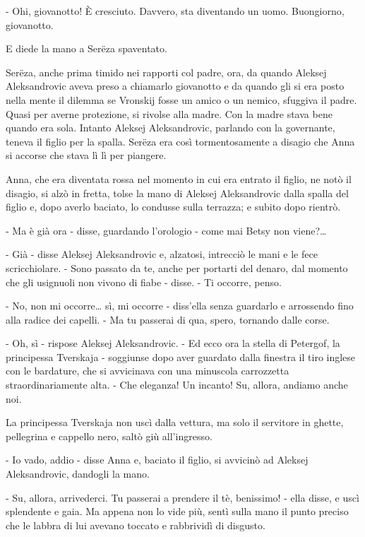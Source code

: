 - Ohi, giovanotto! È cresciuto. Davvero, sta diventando un uomo. Buongiorno, giovanotto. 

E diede la mano a Serëza spaventato. 

Serëza, anche prima timido nei rapporti col padre, ora, da quando Aleksej Aleksandrovic aveva preso a chiamarlo giovanotto e da quando gli si era posto nella mente il dilemma se Vronskij fosse un amico o un nemico, sfuggiva il padre. Quasi per averne protezione, si rivolse alla madre. Con la madre stava bene quando era sola. Intanto Aleksej Aleksandrovic, parlando con la governante, teneva il figlio per la spalla. Serëza era così tormentosamente a disagio che Anna si accorse che stava lì lì per piangere. 

Anna, che era diventata rossa nel momento in cui era entrato il figlio, ne notò il disagio, si alzò in fretta, tolse la mano di Aleksej Aleksandrovic dalla spalla del figlio e, dopo averlo baciato, lo condusse sulla terrazza; e subito dopo rientrò. 

- Ma è già ora - disse, guardando l'orologio - come mai Betsy non viene?\ldots{} 

- Già - disse Aleksej Aleksandrovic e, alzatosi, intrecciò le mani e le fece scricchiolare. - Sono passato da te, anche per portarti del denaro, dal momento che gli usignuoli non vivono di fiabe - disse. - Ti occorre, penso. 

- No, non mi occorre\ldots{} sì, mi occorre - diss'ella senza guardarlo e arrossendo fino alla radice dei capelli. - Ma tu passerai di qua, spero, tornando dalle corse. 

- Oh, sì - rispose Aleksej Aleksandrovic. - Ed ecco ora la stella di Petergof, la principessa Tverskaja - soggiunse dopo aver guardato dalla finestra il tiro inglese con le bardature, che si avvicinava con una minuscola carrozzetta straordinariamente alta. - Che eleganza! Un incanto! Su, allora, andiamo anche noi. 

La principessa Tverskaja non uscì dalla vettura, ma solo il servitore in ghette, pellegrina e cappello nero, saltò giù all'ingresso. 

- Io vado, addio - disse Anna e, baciato il figlio, si avvicinò ad Aleksej Aleksandrovic, dandogli la mano. 

- Su, allora, arrivederci. Tu passerai a prendere il tè, benissimo! - ella disse, e uscì splendente e gaia. Ma appena non lo vide più, sentì sulla mano il punto preciso che le labbra di lui avevano toccato e rabbrividì di disgusto. 

